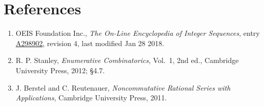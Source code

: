 \documentclass[11pt]{article}
\theoremstyle{definition}
\begin{document}
\section{References}

\begin{enumerate}

\item OEIS Foundation Inc., \emph{The On-Line Encyclopedia of Integer Sequences}, entry \href{https://oeis.org/A298902}{A298902}, revision 4, last modified Jan 28 2018.

\item R. P. Stanley, \emph{Enumerative Combinatorics}, Vol.~1, 2nd ed., Cambridge University Press, 2012; \S4.7.

\item J. Berstel and C. Reutenauer, \emph{Noncommutative Rational Series with Applications}, Cambridge University Press, 2011.

\end{enumerate}
\end{document}
